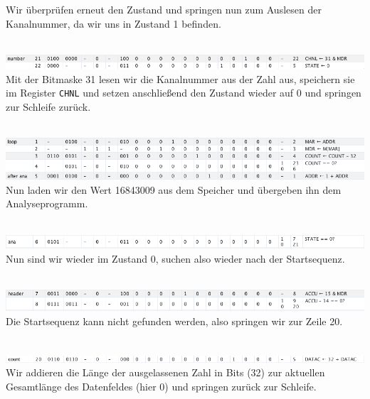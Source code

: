 \documentclass[12pt,titlepage]{article}
\begin{document}
Wir überprüfen erneut den Zustand und springen nun zum Auslesen der Kanalnummer, da wir uns in Zustand 1 befinden.

\leavevmode \\
\includegraphics[width=16cm]{listing/row21-22.png}
\leavevmode \\

Mit der Bitmaske 31 lesen wir die Kanalnummer aus der Zahl aus, speichern sie im Register \texttt{CHNL}
und setzen anschließend den Zustand wieder auf 0 und springen zur Schleife
zurück.

\leavevmode \\
\includegraphics[width=16cm]{listing/row1-5.png}
\leavevmode \\

Nun laden wir den Wert 16843009 aus dem Speicher und übergeben ihn dem Analyseprogramm.

\leavevmode \\
\includegraphics[width=16cm]{listing/row6.png}
\leavevmode \\

Nun sind wir wieder im Zustand 0, suchen also wieder nach der Startsequenz.

\leavevmode \\
\includegraphics[width=16cm]{listing/row7-8.png}
\leavevmode \\

Die Startsequenz kann nicht gefunden werden, also springen wir zur Zeile 20.

\leavevmode \\
\includegraphics[width=16cm]{listing/row20.png}
\leavevmode \\

Wir addieren die Länge der ausgelassenen Zahl in Bits (32) zur aktuellen Gesamtlänge des Datenfeldes (hier 0) und
springen zurück zur Schleife.
\end{document}
